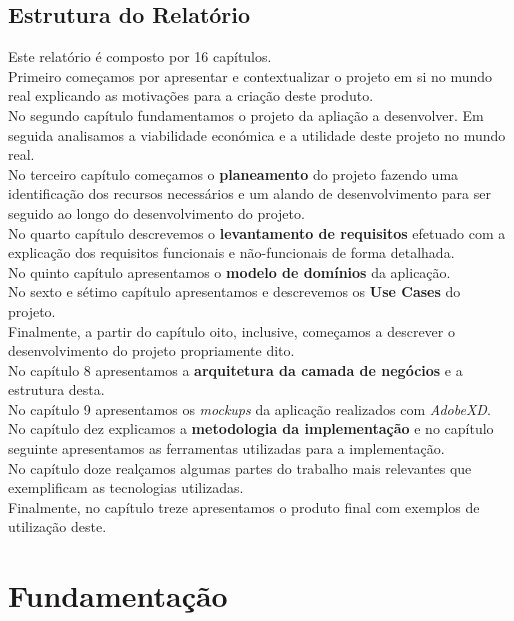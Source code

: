 \documentclass[a4paper]{report}
\begin{document}
    \section{Estrutura do Relatório}
    Este relatório é composto por 16 capítulos.\\
    Primeiro começamos por apresentar e contextualizar o projeto em si no mundo
    real explicando as motivações para a criação deste produto.\\
    No segundo capítulo fundamentamos o projeto da apliação a desenvolver. Em
    seguida analisamos a viabilidade económica e a utilidade deste projeto no
    mundo real.\\
    No terceiro capítulo começamos o \textbf{planeamento} do projeto fazendo
    uma identificação dos recursos necessários e um alando de desenvolvimento
    para ser seguido ao longo do desenvolvimento do projeto.\\
    No quarto capítulo descrevemos o \textbf{levantamento de requisitos}
    efetuado com a explicação dos requisitos funcionais e não-funcionais de
    forma detalhada.\\
    No quinto capítulo apresentamos o \textbf{modelo de domínios} da
    aplicação.\\
    No sexto e sétimo capítulo apresentamos e descrevemos os \textbf{Use Cases}
    do projeto.\\
    Finalmente, a partir do capítulo oito, inclusive, começamos a descrever o
    desenvolvimento do projeto propriamente dito.\\
    No capítulo 8 apresentamos a \textbf{arquitetura da camada de negócios}
    e a estrutura desta.\\
    No capítulo 9 apresentamos os \textit{mockups} da aplicação realizados com
    \textit{AdobeXD}.\\
    No capítulo dez explicamos a \textbf{metodologia da implementação} e no
    capítulo seguinte apresentamos as ferramentas utilizadas para a
    implementação.\\
    No capítulo doze realçamos algumas partes do trabalho mais relevantes que
    exemplificam as tecnologias utilizadas.\\
    Finalmente, no capítulo treze apresentamos o produto final com exemplos de
    utilização deste.




\chapter{Fundamentação}
\end{document}
